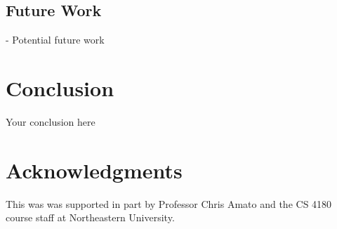 \documentclass{article}
\begin{document}
\subsection{Future Work}
- Potential future work



\section{Conclusion}
Your conclusion here

\section*{Acknowledgments}
This was was supported in part by Professor Chris Amato and the CS 4180 course staff at Northeastern University.


  
  
\end{document}
